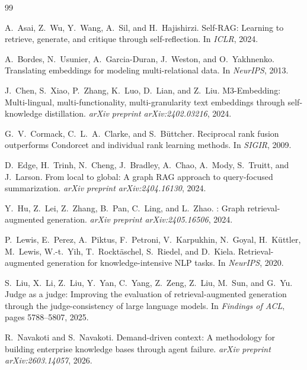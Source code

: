 \documentclass[11pt,a4paper]{article}
\begin{document}
\begin{thebibliography}{99}

A.~Asai, Z.~Wu, Y.~Wang, A.~Sil, and H.~Hajishirzi.
\newblock Self-{RAG}: Learning to retrieve, generate, and critique through self-reflection.
\newblock In \emph{ICLR}, 2024.

A.~Bordes, N.~Usunier, A.~Garcia-Duran, J.~Weston, and O.~Yakhnenko.
\newblock Translating embeddings for modeling multi-relational data.
\newblock In \emph{NeurIPS}, 2013.

J.~Chen, S.~Xiao, P.~Zhang, K.~Luo, D.~Lian, and Z.~Liu.
 {M3}-Embedding: Multi-lingual, multi-functionality, multi-granularity text embeddings through self-knowledge distillation.
\newblock \emph{arXiv preprint arXiv:2402.03216}, 2024.

G.~V.~Cormack, C.~L.~A.~Clarke, and S.~B{\"u}ttcher.
\newblock Reciprocal rank fusion outperforms {Condorcet} and individual rank learning methods.
\newblock In \emph{SIGIR}, 2009.

D.~Edge, H.~Trinh, N.~Cheng, J.~Bradley, A.~Chao, A.~Mody, S.~Truitt, and J.~Larson.
\newblock From local to global: A graph {RAG} approach to query-focused summarization.
\newblock \emph{arXiv preprint arXiv:2404.16130}, 2024.

Y.~Hu, Z.~Lei, Z.~Zhang, B.~Pan, C.~Ling, and L.~Zhao.
: Graph retrieval-augmented generation.
\newblock \emph{arXiv preprint arXiv:2405.16506}, 2024.

P.~Lewis, E.~Perez, A.~Piktus, F.~Petroni, V.~Karpukhin, N.~Goyal, H.~K{\"u}ttler, M.~Lewis, W.-t.~Yih, T.~Rockt{\"a}schel, S.~Riedel, and D.~Kiela.
\newblock Retrieval-augmented generation for knowledge-intensive {NLP} tasks.
\newblock In \emph{NeurIPS}, 2020.

S.~Liu, X.~Li, Z.~Liu, Y.~Yan, C.~Yang, Z.~Zeng, Z.~Liu, M.~Sun, and G.~Yu.
\newblock Judge as a judge: Improving the evaluation of retrieval-augmented generation through the judge-consistency of large language models.
\newblock In \emph{Findings of ACL}, pages 5788--5807, 2025.

R.~Navakoti and S.~Navakoti.
\newblock Demand-driven context: A methodology for building enterprise knowledge bases through agent failure.
\newblock \emph{arXiv preprint arXiv:2603.14057}, 2026.


\end{thebibliography}
\end{document}
